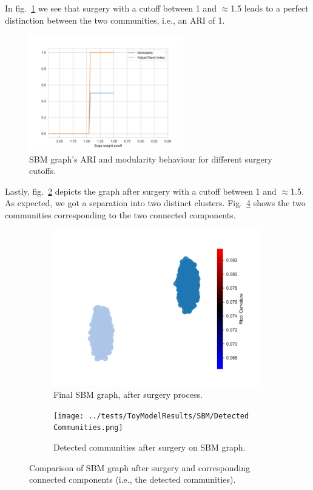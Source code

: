 In fig.~\ref{fig:SBM_Accuracy} we see that surgery with a cutoff between 1 and $\approx$1.5 leads to a perfect distinction between the two communities, i.e., an ARI of 1.

\begin{figure}
    \centering
    \includegraphics[width=0.6\textwidth]{../tests/ToyModelResults/SBM/Surgery Accuracy.png}
    \caption{SBM graph's ARI and modularity behaviour for different surgery cutoffs.}
    \label{fig:SBM_Accuracy}
\end{figure}

Lastly, fig.~\ref{fig:SBM_Communities_a} depicts the graph after surgery with a cutoff between 1 and $\approx$1.5. As expected, we got a separation into two distinct clusters. Fig.~\ref{fig:SBM_Communities_b} shows the two communities corresponding to the two connected components.
\begin{figure}
    \centering
    \begin{subfigure}{0.45\textwidth}
        \centering
        \includegraphics[width=\textwidth]{../tests/ToyModelResults/SBM/After Surgery.png}
        \caption{Final SBM graph, after surgery process.}
        \label{fig:SBM_Communities_a}
    \end{subfigure}
    \hfill
    \begin{subfigure}{0.45\textwidth}
        \centering
        \texttt{[image: ../tests/ToyModelResults/SBM/Detected Communities.png]}
        \caption{Detected communities after surgery on SBM graph.}
        \label{fig:SBM_Communities_b}
    \end{subfigure}
    \caption{Comparison of SBM graph after surgery and corresponding connected components (i.e., the detected communities).}
\end{figure}


